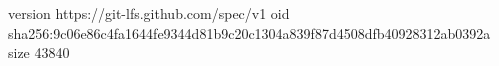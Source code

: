 version https://git-lfs.github.com/spec/v1
oid sha256:9c06e86c4fa1644fe9344d81b9c20c1304a839f87d4508dfb40928312ab0392a
size 43840
